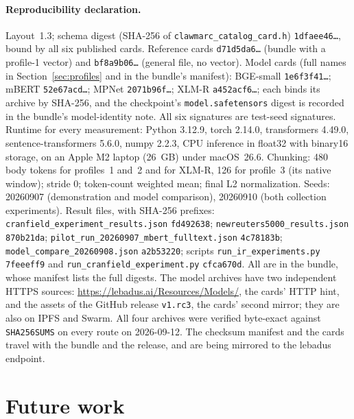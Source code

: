 \documentclass[sigconf]{acmart}
\begin{document}
\paragraph{Reproducibility declaration.} Layout~1.3; schema digest (SHA-256
of \nolinkurl{clawmarc_catalog_card.h}) \texttt{1dfaee46\ldots}, bound by
all six published cards. Reference cards \texttt{d71d5da6\ldots} (bundle
with a profile-1 vector) and \texttt{bf8a9b06\ldots} (general file, no
vector). Model cards (full names in Section~\ref{sec:profiles} and in the
bundle's manifest): BGE-small \texttt{1e6f3f41\ldots}; mBERT
\texttt{52e67acd\ldots}; MPNet \texttt{2071b96f\ldots}; XLM-R
\texttt{a452acf6\ldots}; each binds its archive by SHA-256, and the
checkpoint's \nolinkurl{model.safetensors} digest is recorded in the bundle's
model-identity note. All six signatures are test-seed signatures. Runtime for every
measurement: Python 3.12.9, torch 2.14.0, transformers 4.49.0,
sentence-transformers 5.6.0, numpy 2.2.3, CPU inference in float32 with
binary16 storage, on an Apple M2 laptop (26~GB) under macOS~26.6. Chunking:
480 body tokens for profiles~1 and~2 and for XLM-R, 126 for profile~3 (its
native window); stride 0; token-count weighted mean; final L2
normalization. Seeds: 20260907 (demonstration and model comparison),
20260910 (both collection experiments). Result files, with SHA-256
prefixes: \nolinkurl{cranfield_experiment_results.json} \texttt{fd492638};
\nolinkurl{newreuters5000_results.json} \texttt{870b21da};
\nolinkurl{pilot_run_20260907_mbert_fulltext.json} \texttt{4c78183b};
\nolinkurl{model_compare_20260908.json} \texttt{a2b53220}; scripts
\nolinkurl{run_ir_experiments.py} \texttt{7feeeff9} and
\nolinkurl{run_cranfield_experiment.py} \texttt{cfca670d}. All are in the
bundle, whose manifest lists the full digests. The model archives have two
independent HTTPS sources: \url{https://lebadus.ai/Resources/Models/}, the
cards' HTTP hint, and the assets of the GitHub release \texttt{v1.rc3}, the
cards' second mirror; they are also on IPFS and Swarm. All four archives were
verified byte-exact against \nolinkurl{SHA256SUMS} on every route on
2026-09-12. The checksum manifest and the cards travel with the bundle and
the release, and are being mirrored to the lebadus endpoint.
\endgroup

\section{Future work}
\label{sec:governance}
\end{document}
